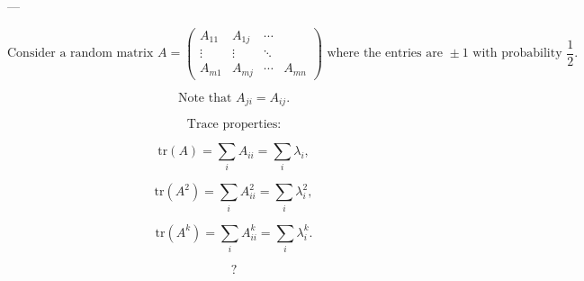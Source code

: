 \documentclass[11pt]{article}
\theoremstyle{definition}
\theoremstyle{remark}
\begin{document}
---

\[
\text{Consider a random matrix } A = \begin{pmatrix}
A_{11} & A_{1j} & \cdots \\
\vdots & \vdots & \ddots \\
A_{m1} & A_{mj} & \cdots & A_{mn}
\end{pmatrix} \text{ where the entries are } \pm 1 \text{ with probability } \frac{1}{2}.
\]

\[
\text{Note that } A_{ji} = A_{ij}.
\]

\[
\text{Trace properties:}
\]

\[
\text{tr}(A) = \sum_i A_{ii} = \sum_i \lambda_i,
\]

\[
\text{tr}(A^2) = \sum_i A_{ii}^2 = \sum_i \lambda_i^2,
\]

\[
\text{tr}(A^k) = \sum_i A_{ii}^k = \sum_i \lambda_i^k.
\]

\[
\text{?}
\]
\end{document}
